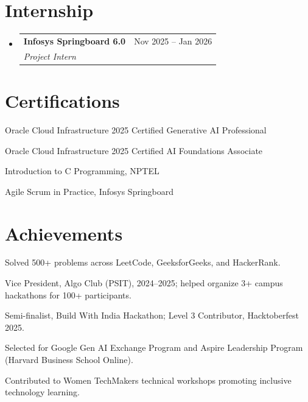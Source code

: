 \documentclass[a4paper,11pt]{article}
\makeatletter
\newcommand{\resumeSubheading}[4]{
  \item
  \begin{tabular*}{\textwidth}{l@{\extracolsep{\fill}}r}
    \textbf{#1} & #2 \\
    \textit{\small #3} & \textit{\small #4}
  \end{tabular*}\vspace{-5pt}
}
\makeatother
\begin{document}
\section{Internship}
\begin{itemize}[leftmargin=0.15in,label={}]
\resumeSubheading
{Infosys Springboard 6.0}{Nov 2025 -- Jan 2026}
{Project Intern}{}
\end{itemize}

\section{Certifications}
\begin{itemize}[leftmargin=0.15in]
\small{
\item Oracle Cloud Infrastructure 2025 Certified Generative AI Professional
\item Oracle Cloud Infrastructure 2025 Certified AI Foundations Associate
\item Introduction to C Programming, NPTEL
\item Agile Scrum in Practice, Infosys Springboard
}
\end{itemize}

\section{Achievements}
\begin{itemize}[leftmargin=0.15in,itemsep=0pt,topsep=0pt]
\small{
\item Solved 500+ problems across LeetCode, GeeksforGeeks, and HackerRank.
\item Vice President, Algo Club (PSIT), 2024--2025; helped organize 3+ campus hackathons for 100+ participants.
\item Semi-finalist, Build With India Hackathon; Level 3 Contributor, Hacktoberfest 2025.
\item Selected for Google Gen AI Exchange Program and Aspire Leadership Program (Harvard Business School Online).
\item Contributed to Women TechMakers technical workshops promoting inclusive technology learning.
}
\end{itemize}
\end{document}
